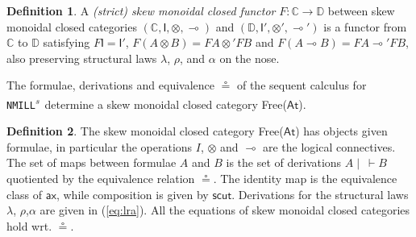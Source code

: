 \documentclass[submission,copyright,creativecommons]{eptcs}
\theoremstyle{definition}
\newtheorem{defn}{Definition}[section]
\newcommand{\ax}{\mathsf{ax}}
\newcommand{\ot}{\otimes}
\newcommand{\lolli}{\multimap}
\newcommand{\I}{\mathsf{I}}
\newcommand{\NMILL}{\texttt{NMILL}}
\newcommand{\SkNMILL}{\NMILL\textsuperscript{\textit{s}}}
\newcommand{\FSkMCC}{\textsf{Free}}
\begin{document}
\begin{defn}
  A \emph{(strict) skew monoidal closed functor} $F : \mathbb{C} \rightarrow \mathbb{D}$ between skew monoidal closed categories $(\mathbb{C} , \I , \ot , \lolli)$ and $(\mathbb{D} , \I' , \ot' , \lolli')$ is a functor from $\mathbb{C}$ to $\mathbb{D}$ satisfying
    $F \I = \I'$, $F (A \ot B) = F A \ot' F B$ and
    $F(A \lolli B) = F A \lolli' F B$, also preserving  structural laws $\lambda$, $\rho$, and $\alpha$ on the nose.
\end{defn}

The formulae, derivations and equivalence $\circeq$ of the sequent calculus for \SkNMILL\ determine a skew monoidal closed category \FSkMCC($\mathsf{At}$).
\begin{defn}\label{def:fskmcc}
  The skew monoidal closed category \FSkMCC($\mathsf{At}$) has
  objects given formulae, in particular the operations $I$, $\ot$ and $\lolli$ are the logical connectives. The set of maps between formulae $A$ and $B$ is the set of derivations $A \mid ~ \vdash B$ quotiented by the equivalence relation $\circeq$. The identity map is the equivalence class of $\ax$, while composition is given by $\mathsf{scut}$. Derivations for the structural laws $\lambda$, $\rho$,$\alpha$ are given in (\ref{eq:lra}). All the equations of skew monoidal closed categories hold wrt. $\circeq$.
\end{defn}
\end{document}
